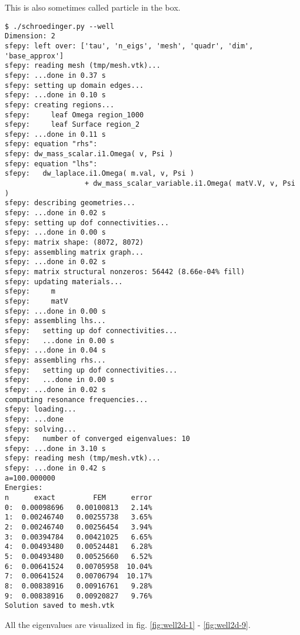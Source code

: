 This is also sometimes called particle in the box.

\begin{lstlisting}
$ ./schroedinger.py --well
Dimension: 2
sfepy: left over: ['tau', 'n_eigs', 'mesh', 'quadr', 'dim', 'base_approx']
sfepy: reading mesh (tmp/mesh.vtk)...
sfepy: ...done in 0.37 s
sfepy: setting up domain edges...
sfepy: ...done in 0.10 s
sfepy: creating regions...
sfepy:     leaf Omega region_1000
sfepy:     leaf Surface region_2
sfepy: ...done in 0.11 s
sfepy: equation "rhs":
sfepy: dw_mass_scalar.i1.Omega( v, Psi )
sfepy: equation "lhs":
sfepy:   dw_laplace.i1.Omega( m.val, v, Psi )
                   + dw_mass_scalar_variable.i1.Omega( matV.V, v, Psi )
sfepy: describing geometries...
sfepy: ...done in 0.02 s
sfepy: setting up dof connectivities...
sfepy: ...done in 0.00 s
sfepy: matrix shape: (8072, 8072)
sfepy: assembling matrix graph...
sfepy: ...done in 0.02 s
sfepy: matrix structural nonzeros: 56442 (8.66e-04% fill)
sfepy: updating materials...
sfepy:     m
sfepy:     matV
sfepy: ...done in 0.00 s
sfepy: assembling lhs...
sfepy:   setting up dof connectivities...
sfepy:   ...done in 0.00 s
sfepy: ...done in 0.04 s
sfepy: assembling rhs...
sfepy:   setting up dof connectivities...
sfepy:   ...done in 0.00 s
sfepy: ...done in 0.02 s
computing resonance frequencies...
sfepy: loading...
sfepy: ...done
sfepy: solving...
sfepy:   number of converged eigenvalues: 10
sfepy: ...done in 3.10 s
sfepy: reading mesh (tmp/mesh.vtk)...
sfepy: ...done in 0.42 s
a=100.000000
Energies:
n      exact         FEM      error
0:  0.00098696   0.00100813   2.14%
1:  0.00246740   0.00255738   3.65%
2:  0.00246740   0.00256454   3.94%
3:  0.00394784   0.00421025   6.65%
4:  0.00493480   0.00524481   6.28%
5:  0.00493480   0.00525660   6.52%
6:  0.00641524   0.00705958  10.04%
7:  0.00641524   0.00706794  10.17%
8:  0.00838916   0.00916761   9.28%
9:  0.00838916   0.00920827   9.76%
Solution saved to mesh.vtk
\end{lstlisting}

All the eigenvalues are visualized in fig. \ref{fig:well2d-1} -
\ref{fig:well2d-9}.






